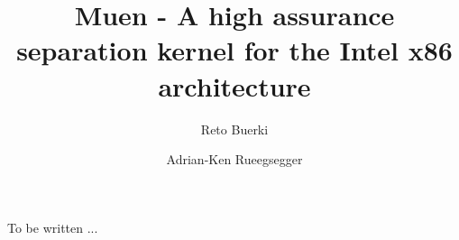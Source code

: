 \documentclass[a4paper,twoside]{report}
\title{Muen - A high assurance separation kernel for the Intel x86 architecture}
\author{Reto Buerki \and Adrian-Ken Rueegsegger}
\begin{document}
\maketitle
To be written ...
\end{document}
